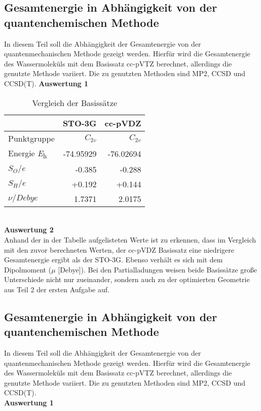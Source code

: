\documentclass[12pt]{article}
\begin{document}
\begin{onehalfspace}
\subsection{Gesamtenergie in Abhängigkeit von der quantenchemischen Methode}
In diesem Teil soll die Abhängigkeit der Gesamtenergie von der quantenmechanischen Methode gezeigt werden. Hierfür wird die Gesamtenergie des Wassermoleküls mit dem Basissatz cc-pVTZ berechnet, allerdings die genutzte Methode variiert. Die zu genutzten Methoden sind MP2, CCSD und CCSD(T).
\newpage
\noindent
\textbf{Auswertung 1}\\
\begin{table}[!htpb]
\centering
\caption{Vergleich der Basissätze}
\begin{tabular}{lrr}
\toprule
 &
STO-3G &
cc-pVDZ \\
\midrule
Punktgruppe & $C _{2v}$ & $C _{2v}$\\
Energie \si{\hartree}    & -74.95929 & -76.02694  \\
$S _O / \textit{e}$ & -0.385 & -0.288  \\
$S _H / \textit{e}$ & +0.192 & +0.144  \\
$\nu / \textit{Debye}$ & 1.7371 & 2.0175  \\
\bottomrule
\end{tabular}
\end{table}\\
\textbf{Auswertung 2}\\
Anhand der in der Tabelle aufgelisteten Werte ist zu erkennen, dass im Vergleich mit den zuvor berechneten Werten, der cc-pVDZ Basissatz eine niedrigere Gesamtenergie ergibt als der STO-3G. Ebenso verhält es sich mit dem Dipolmoment ($\mu$ [Debye]). Bei den Partialladungen weisen beide Basissätze große Unterschiede nicht nur zueinander, sondern auch zu der optimierten Geometrie aus Teil 2 der ersten Aufgabe auf.
\subsection{Gesamtenergie in Abhängigkeit von der quantenchemischen Methode}
In diesem Teil soll die Abhängigkeit der Gesamtenergie von der quantenmechanischen Methode gezeigt werden. Hierfür wird die Gesamtenergie des Wassermoleküls mit dem Basissatz cc-pVTZ berechnet, allerdings die genutzte Methode variiert. Die zu genutzten Methoden sind MP2, CCSD und CCSD(T).\\
\textbf{Auswertung 1}\\


\end{onehalfspace}
\end{document}

